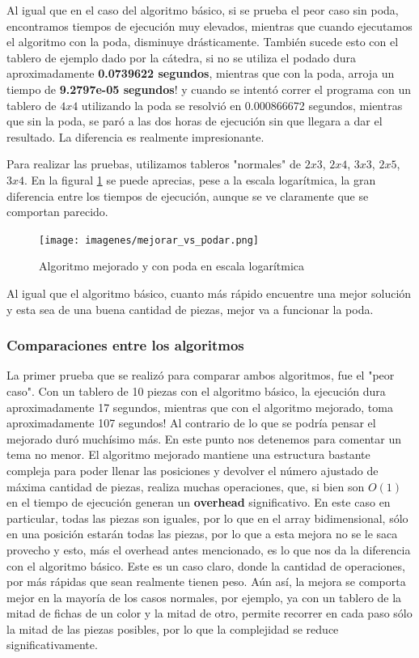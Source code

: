 \documentclass[11pt,a4paper]{article}
\begin{document}
Al igual que en el caso del algoritmo básico, si se prueba el peor caso sin poda, encontramos tiempos de ejecución muy elevados, mientras que cuando ejecutamos el algoritmo con la poda, disminuye drásticamente. También sucede esto con el tablero de ejemplo dado por la cátedra, si no se utiliza el podado dura aproximadamente \textbf{0.0739622 segundos}, mientras que con la poda, arroja un tiempo de \textbf{9.2797e-05 segundos}! y cuando se intentó correr el programa con un tablero de $4x4$ utilizando la poda se resolvió en 0.000866672 segundos, mientras que sin la poda, se paró a las dos horas de ejecución sin que llegara a dar el resultado. La diferencia es realmente impresionante.

Para realizar las pruebas, utilizamos tableros "normales" de $2x3$, $2x4$, $3x3$, $2x5$, $3x4$. En la figural \ref{fig:mejorar_vs_podar} se puede aprecias, pese a la escala logarítmica, la gran diferencia entre los tiempos de ejecución, aunque se ve claramente que se comportan parecido.

	\begin{figure}[H]
    	\begin{center}
        	\texttt{[image: imagenes/mejorar\_vs\_podar.png]}
    	\end{center}
    	\caption{Algoritmo mejorado y con poda en escala logarítmica}
    	\label{fig:mejorar_vs_podar}
	\end{figure}

Al igual que el algoritmo básico, cuanto más rápido encuentre una mejor solución y esta sea de una buena cantidad de piezas, mejor va a funcionar la poda.

\subsubsection*{Comparaciones entre los algoritmos}

La primer prueba que se realizó para comparar ambos algoritmos, fue el "peor caso". Con un tablero de 10 piezas con el algoritmo básico, la ejecución dura aproximadamente 17 segundos, mientras que con el algoritmo mejorado, toma aproximadamente 107 segundos! Al contrario de lo que se podría pensar el mejorado duró muchísimo más. En este punto nos detenemos para comentar un tema no menor.
El algoritmo mejorado mantiene una estructura bastante compleja para poder llenar las posiciones y devolver el número ajustado de máxima cantidad de piezas, realiza muchas operaciones, que, si bien son $O(1)$ en el tiempo de ejecución generan un \textbf{overhead} significativo. En este caso en particular, todas las piezas son iguales, por lo que en el array bidimensional, sólo en una posición estarán todas las piezas, por lo que a esta mejora no se le saca provecho y esto, más el overhead antes mencionado, es lo que nos da la diferencia con el algoritmo básico. Este es un caso claro, donde la cantidad de operaciones, por más rápidas que sean realmente tienen peso.
Aún así, la mejora se comporta mejor en la mayoría de los casos normales, por ejemplo, ya con un tablero de la mitad de fichas de un color y la mitad de otro, permite recorrer en cada paso sólo la mitad de las piezas posibles, por lo que la complejidad se reduce significativamente.
\end{document}
